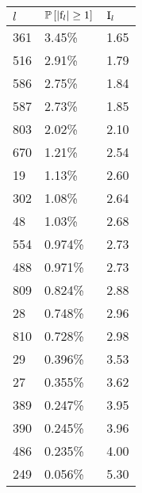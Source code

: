 \begin{tabular}{lll}
\toprule
$l$ & $\operatorname{\mathbb{P}} \left[ |{\mathrm{f}}_l| \geq 1 \right]$ & ${\mathrm{I}}_l$ \\
\midrule
361 & 3.45\hphantom{0}\% &  1.65 \\
516 & 2.91\hphantom{0}\% &  1.79 \\
586 & 2.75\hphantom{0}\% &  1.84 \\
587 & 2.73\hphantom{0}\% &  1.85 \\
803 & 2.02\hphantom{0}\% &  2.10 \\
670 & 1.21\hphantom{0}\% &  2.54 \\
19  & 1.13\hphantom{0}\% &  2.60 \\
302 & 1.08\hphantom{0}\% &  2.64 \\
48  & 1.03\hphantom{0}\% &  2.68 \\
554 & 0.974\% &  2.73 \\
\midrule
488 & 0.971\% &  2.73 \\
809 & 0.824\% &  2.88 \\
28  & 0.748\% &  2.96 \\
810 & 0.728\% &  2.98 \\
29  & 0.396\% &  3.53 \\
27  & 0.355\% &  3.62 \\
389 & 0.247\% &  3.95 \\
390 & 0.245\% &  3.96 \\
486 & 0.235\% &  4.00 \\
249 & 0.056\% &  5.30 \\
\bottomrule
\end{tabular}
